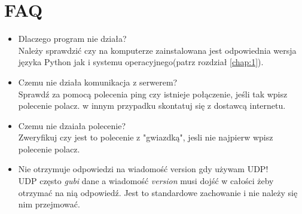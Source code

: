 \documentclass[a4paper,polish,12pt]{article}
\begin{document}
\section{FAQ}
\begin{itemize}
\item Dlaczego program nie działa?\\
Należy sprawdzić czy na komputerze zainstalowana jest odpowiednia wersja języka Python jak i systemu operacyjnego(patrz rozdział \autoref{chap:1}).
\item Czemu nie działa komunikacja z serwerem?\\
Sprawdź za pomocą polecenia ping czy istnieje połączenie, jeśli tak wpisz polecenie polacz. w innym przypadku skontatuj się z dostawcą internetu.
\item Czemu nie dzaiała polecenie?\\
Zweryfikuj czy jest to polecenie z "gwiazdką", jesli nie najpierw wpisz polecenie polacz.
\item Nie otrzymuje odpowiedzi na wiadomość version gdy używam UDP!\\
UDP często \textit{gubi} dane a wiadomość \textit{version} musi dojść w całości żeby otrzymać na nią odpowiedź. Jest to standardowe zachowanie i nie należy się nim przejmować.
\end{itemize}
\end{document}
